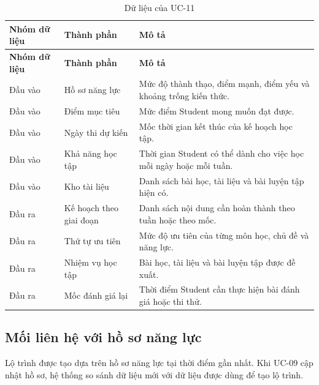 \begin{longtable}{|p{3.5cm}|p{5.3cm}|p{5.6cm}|}
	\caption{Dữ liệu của UC-11}
	\label{tab:uc11-data}\\
	\hline
	\textbf{Nhóm dữ liệu} &
	\textbf{Thành phần} &
	\textbf{Mô tả} \\
	\hline
	\endfirsthead
	
	\hline
	\textbf{Nhóm dữ liệu} &
	\textbf{Thành phần} &
	\textbf{Mô tả} \\
	\hline
	\endhead
	
	Đầu vào &
	Hồ sơ năng lực &
	Mức độ thành thạo, điểm mạnh, điểm yếu và khoảng trống kiến thức. \\
	\hline
	
	Đầu vào &
	Điểm mục tiêu &
	Mức điểm Student mong muốn đạt được. \\
	\hline
	
	Đầu vào &
	Ngày thi dự kiến &
	Mốc thời gian kết thúc của kế hoạch học tập. \\
	\hline
	
	Đầu vào &
	Khả năng học tập &
	Thời gian Student có thể dành cho việc học mỗi ngày hoặc mỗi tuần. \\
	\hline
	
	Đầu vào &
	Kho tài liệu &
	Danh sách bài học, tài liệu và bài luyện tập hiện có. \\
	\hline
	
	Đầu ra &
	Kế hoạch theo giai đoạn &
	Danh sách nội dung cần hoàn thành theo tuần hoặc theo mốc. \\
	\hline
	
	Đầu ra &
	Thứ tự ưu tiên &
	Mức độ ưu tiên của từng môn học, chủ đề và năng lực. \\
	\hline
	
	Đầu ra &
	Nhiệm vụ học tập &
	Bài học, tài liệu và bài luyện tập được đề xuất. \\
	\hline
	
	Đầu ra &
	Mốc đánh giá lại &
	Thời điểm Student cần thực hiện bài đánh giá hoặc thi thử. \\
	\hline
	
\end{longtable}

\subsection{Mối liên hệ với hồ sơ năng lực}

Lộ trình được tạo dựa trên hồ sơ năng lực tại thời điểm gần nhất. Khi
UC-09 cập nhật hồ sơ, hệ thống so sánh dữ liệu mới với dữ liệu được dùng
để tạo lộ trình.


